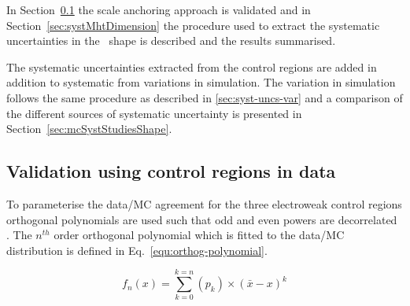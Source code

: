 In Section~\ref{sec:valid13} the scale anchoring approach is validated and 
in Section~\ref{sec:systMhtDimension} the procedure used to 
extract the systematic uncertainties in the \mht~shape is described 
and the results summarised.

The systematic uncertainties extracted from the control regions
are added in addition to systematic from variations in simulation.
The variation in simulation follows the same procedure as described in
\ref{sec:syst-uncs-var} and a comparison of the different sources of systematic uncertainty
is presented in Section~\ref{sec:mcSystStudiesShape}.

\subsection{Validation using control regions in data}
\label{sec:valid13}
To parameterise the data/MC agreement
for the three electroweak control regions
orthogonal polynomials are used such that odd and even powers 
are decorrelated \cite{cohen2013applied}. 
The $n^{th}$ order orthogonal polynomial which is fitted to the data/MC 
distribution is defined in Eq.~\ref{equ:orthog-polynomial}.

\begin{equation}
  \label{equ:orthog-polynomial}
  f_n(x) = \sum_{k=0}^{k=n}{(p_k)\times(\bar{x}-x)^k}
\end{equation}

